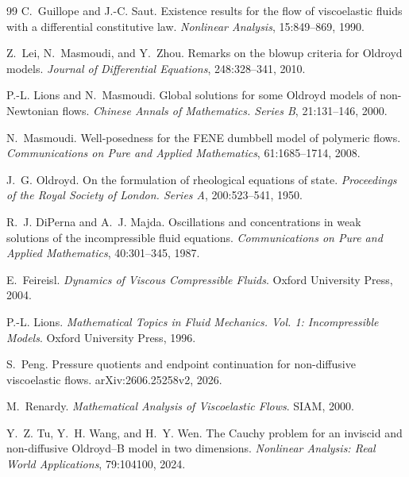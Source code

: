 \documentclass[11pt]{article}
\numberwithin{equation}{section}
\begin{document}
\begin{thebibliography}{99}
C.~Guillope and J.-C. Saut.
\newblock Existence results for the flow of viscoelastic fluids with a
 differential constitutive law.
\newblock \emph{Nonlinear Analysis}, 15:849--869, 1990.

Z.~Lei, N.~Masmoudi, and Y.~Zhou.
\newblock Remarks on the blowup criteria for Oldroyd models.
\newblock \emph{Journal of Differential Equations}, 248:328--341, 2010.

P.-L. Lions and N.~Masmoudi.
\newblock Global solutions for some Oldroyd models of non-Newtonian flows.
\newblock \emph{Chinese Annals of Mathematics. Series B}, 21:131--146, 2000.

N.~Masmoudi.
\newblock Well-posedness for the FENE dumbbell model of polymeric flows.
\newblock \emph{Communications on Pure and Applied Mathematics}, 61:1685--1714,
2008.

J.~G. Oldroyd.
\newblock On the formulation of rheological equations of state.
\newblock \emph{Proceedings of the Royal Society of London. Series A},
200:523--541, 1950.


R.~J. DiPerna and A.~J. Majda.
\newblock Oscillations and concentrations in weak solutions of the
incompressible fluid equations.
\newblock \emph{Communications on Pure and Applied Mathematics}, 40:301--345,
1987.

E.~Feireisl.
\newblock \emph{Dynamics of Viscous Compressible Fluids}.
\newblock Oxford University Press, 2004.

P.-L. Lions.
\newblock \emph{Mathematical Topics in Fluid Mechanics. Vol. 1: Incompressible
Models}.
\newblock Oxford University Press, 1996.

S.~Peng.
\newblock Pressure quotients and endpoint continuation for non-diffusive
viscoelastic flows.
\newblock arXiv:2606.25258v2, 2026.

M.~Renardy.
\newblock \emph{Mathematical Analysis of Viscoelastic Flows}.
\newblock SIAM, 2000.

Y.~Z. Tu, Y.~H. Wang, and H.~Y. Wen.
\newblock The Cauchy problem for an inviscid and non-diffusive Oldroyd--B model
in two dimensions.
\newblock \emph{Nonlinear Analysis: Real World Applications}, 79:104100, 2024.

\end{thebibliography}
\end{document}
